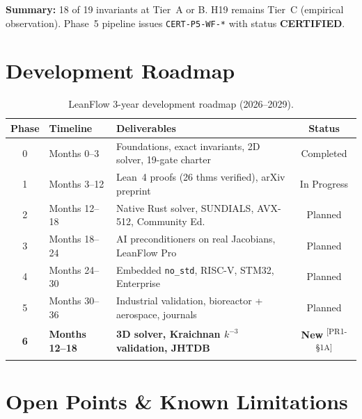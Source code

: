 \documentclass[11pt,a4paper,twoside]{article}
\newcommand{\prtag}[1]{\textsuperscript{\color{Dandelion!70!black}[PR1-\S#1]}}
\begin{document}
\textbf{Summary:} 18 of 19 invariants at Tier~A or B. H19 remains Tier~C (empirical observation). Phase~5 pipeline issues \texttt{CERT-P5-WF-*} with status \textbf{CERTIFIED}.

\section{Development Roadmap}
\label{sec:roadmap}

\begin{table}[H]
\centering
\caption{LeanFlow 3-year development roadmap (2026--2029).}
\label{tab:roadmap}
\begin{tabularx}{\textwidth}{clXc}
\toprule
\textbf{Phase} & \textbf{Timeline} & \textbf{Deliverables} & \textbf{Status} \\
\midrule
0 & Months 0--3 & Foundations, exact invariants, 2D solver, 19-gate charter & Completed \\
1 & Months 3--12 & Lean~4 proofs (26 thms verified), arXiv preprint & In Progress \\
2 & Months 12--18 & Native Rust solver, SUNDIALS, AVX-512, Community Ed. & Planned \\
3 & Months 18--24 & AI preconditioners on real Jacobians, LeanFlow Pro & Planned \\
4 & Months 24--30 & Embedded \texttt{no\_std}, RISC-V, STM32, Enterprise & Planned \\
5 & Months 30--36 & Industrial validation, bioreactor + aerospace, journals & Planned \\
\midrule
\textbf{6} & \textbf{Months 12--18} & \textbf{3D solver, Kraichnan $k^{-3}$ validation, JHTDB} & \textbf{New} \prtag{1A} \\
\bottomrule
\end{tabularx}
\end{table}

\section{Open Points \& Known Limitations}
\label{sec:open}
\end{document}
